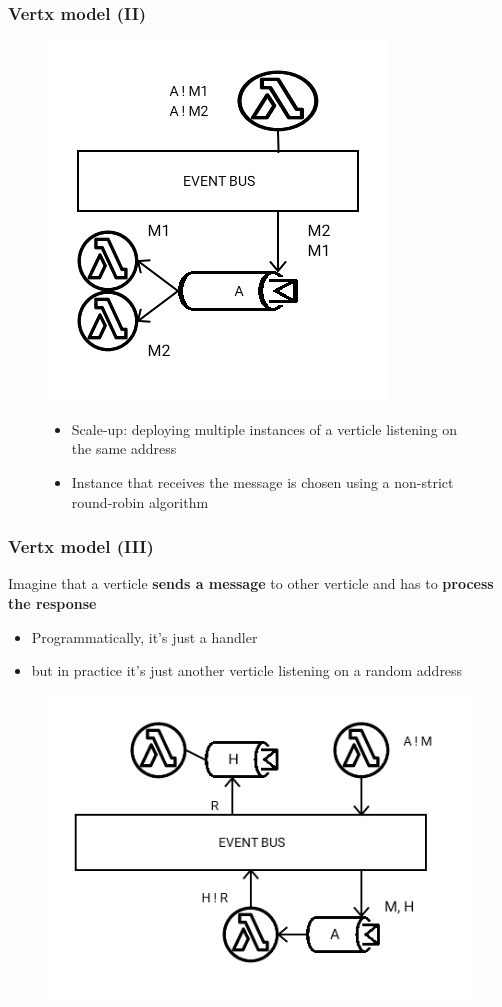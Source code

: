 \documentclass{beamer}
\begin{document}
\begin{frame}
\frametitle{Vertx model (II)}
\begin{figure}
\includegraphics[scale=0.3]{images/vertx-model-2.png}
\begin{itemize}
\item<1-> Scale-up: deploying multiple instances of a verticle listening on the same address
\item<2-> Instance that receives the message is chosen using a non-strict round-robin algorithm 
\end{itemize}
\end{figure}
\end{frame}

\begin{frame}
\frametitle{Vertx model (III)}
Imagine that a verticle \textbf{sends a message} to other verticle and has to\textbf{ process the response}
\begin{itemize}
\item<1-> Programmatically, it's just a handler
\item<2-> but in practice it's just another verticle listening on a random address
\end{itemize}
\begin{figure}
\includegraphics[scale=0.3]{images/vertx-model-3.png}
\end{figure}
\end{frame}
\end{document}
